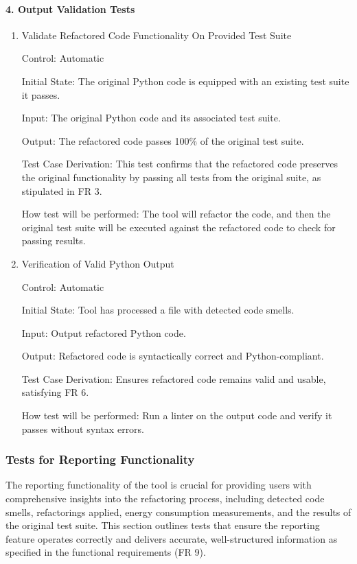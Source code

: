 \documentclass[12pt, titlepage]{article}
\begin{document}
\paragraph{4. Output Validation Tests}
\begin{enumerate}
  \item{Validate Refactored Code Functionality On Provided Test Suite\\}

  Control: Automatic
  
  Initial State: The original Python code is equipped with an existing test suite it passes.
  
  Input: The original Python code and its associated test suite.
  
  Output: The refactored code passes 100\% of the original test suite.
  
  Test Case Derivation: This test confirms that the refactored code preserves the original functionality by passing all tests from the original suite, as stipulated in FR 3.
  
  How test will be performed: The tool will refactor the code, and then the original test suite will be executed against the refactored code to check for passing results.
  
  \item{Verification of Valid Python Output\\}

  Control: Automatic
  
  Initial State: Tool has processed a file with detected code smells.
  
  Input: Output refactored Python code.
  
  Output: Refactored code is syntactically correct and Python-compliant.
  
  Test Case Derivation: Ensures refactored code remains valid and usable, satisfying FR 6.
  
  How test will be performed: Run a linter on the output code and verify it passes without syntax errors.
  
\end{enumerate}

\subsubsection{Tests for Reporting Functionality}

The reporting functionality of the tool is crucial for providing users with comprehensive insights into the refactoring process, including detected code smells, refactorings applied, energy consumption measurements, and the results of the original test suite. This section outlines tests that ensure the reporting feature operates correctly and delivers accurate, well-structured information as specified in the functional requirements (FR 9). 
		
\end{document}
